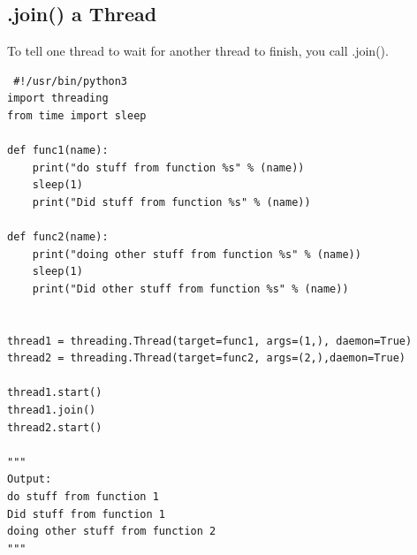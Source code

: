 \documentclass{report}
\begin{document}
    \subsection{.join() a Thread}
    \bigbreak \noindent 
    To tell one thread to wait for another thread to finish, you call .join().
    \bigbreak \noindent 
    \begin{mdframed}
    \begin{verbatim}
 #!/usr/bin/python3
import threading
from time import sleep

def func1(name):
    print("do stuff from function %s" % (name))
    sleep(1)
    print("Did stuff from function %s" % (name))

def func2(name):
    print("doing other stuff from function %s" % (name))
    sleep(1)
    print("Did other stuff from function %s" % (name))


thread1 = threading.Thread(target=func1, args=(1,), daemon=True)
thread2 = threading.Thread(target=func2, args=(2,),daemon=True) 

thread1.start()
thread1.join()
thread2.start()

"""
Output:
do stuff from function 1
Did stuff from function 1
doing other stuff from function 2
"""
        \end{verbatim}
    \end{mdframed}
    \bigbreak \noindent \bigbreak \noindent 
\end{document}
